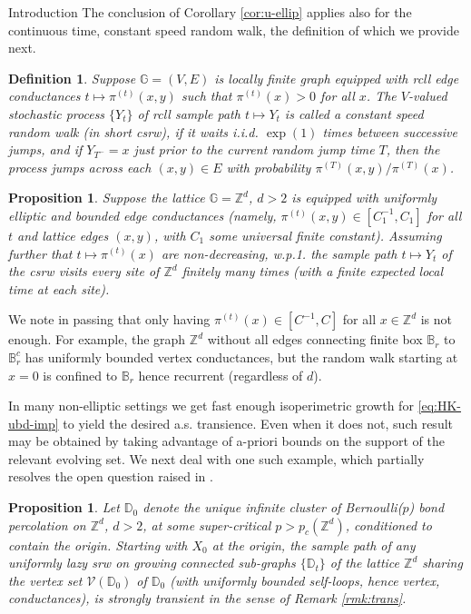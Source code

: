 \documentclass[12pt,reqno]{amsart}
\numberwithin{equation}{section}
\newtheorem{ppn}[thm]{Proposition}
\newtheorem{defn}[thm]{Definition}
\theoremstyle{definition}
\begin{document}
\begin{section}{Introduction}
\smallskip
The conclusion of Corollary \ref{cor:u-ellip} applies also
for the continuous time, constant speed random walk, the 
definition of which we provide next.
\begin{defn}\label{defn:csrw}
Suppose ${\mathbb{G}}=(V,E)$ is locally finite graph 
equipped with {{\sc\lowercase{{rcll}}}} edge conductances 
$t \mapsto \pi^{(t)}(x,y)$ such that $\pi^{(t)}(x)>0$ for all $x$.
The $V$-valued stochastic process $\{Y_t\}$ of {{\sc\lowercase{{RCLL}}}} sample path 
$t \mapsto Y_t$ is called  
a constant speed random walk (in short {{\sc\lowercase{{CSRW}}}}), if it waits 
i.i.d. $\exp(1)$ times between successive jumps, and if 
$Y_{T^-} = x$ just prior to the current random jump time $T$, then 
the process jumps across each $(x,y) \in E$ with probability 
$\pi^{(T)}(x,y)/\pi^{(T)}(x)$.
\end{defn}
\begin{ppn}\label{csrw}
Suppose the lattice $\mathbb{G}={\mathbb{Z}}^d$, $d>2$ is 
equipped with \emph{uniformly elliptic} and bounded \emph{edge conductances}
(namely, $\pi^{(t)}(x,y)\in[C_1^{-1},C_1]$ for all $t$ and lattice edges 
$(x,y)$, with $C_1$ some universal finite constant). 
Assuming further that $t \mapsto \pi^{(t)}(x)$ are non-decreasing, w.p.1.
the sample path $t \mapsto Y_t$ of the {{\sc\lowercase{{CSRW}}}} visits 
every site of ${\mathbb{Z}}^d$ finitely many times (with a finite 
expected local time at each site).
\end{ppn}

\smallskip
We note in passing that only having $\pi^{(t)}(x)\in[C^{-1},C]$ 
for all $x \in {\mathbb{Z}}^d$ is not enough. For example, the graph ${\mathbb{Z}}^d$ 
without all edges connecting finite box ${\mathbb{B}}_r$ to ${\mathbb{B}}_{r}^c$
has uniformly bounded vertex conductances, but the random 
walk starting at $x=0$ is confined to ${\mathbb{B}}_{r}$ 
hence recurrent (regardless of $d$). 

\medskip
In many non-elliptic settings we get fast enough isoperimetric growth  
for \eqref{eq:HK-ubd-imp} to yield the desired a.s. transience. Even 
when it does not, such result may be obtained by taking advantage of 
a-priori bounds on the support of the relevant evolving set. We next
deal with one such example, which partially resolves the open question 
raised in \cite[Remark 1.12]{DHS}.

\begin{ppn}\label{percol}
Let ${\mathbb{D}}_0$ denote the unique infinite cluster of
Bernoulli($p$) bond percolation on ${\mathbb{Z}}^d$, $d>2$,
at some super-critical $p > p_c({\mathbb{Z}}^d)$, conditioned 
to contain the origin. Starting with $X_0$ at the origin, 
the sample path of any uniformly lazy
{{\sc\lowercase{{srw}}}} on growing connected sub-graphs $\{{\mathbb{D}}_t\}$ of 
the lattice ${\mathbb{Z}}^d$ sharing the vertex set $\mathcal{V}({\mathbb{D}}_0)$ of 
${\mathbb{D}}_0$ (with uniformly bounded self-loops, hence vertex, conductances),
is strongly transient in the sense of Remark \ref{rmk:trans}.
\end{ppn}


\end{section}
\end{document}
